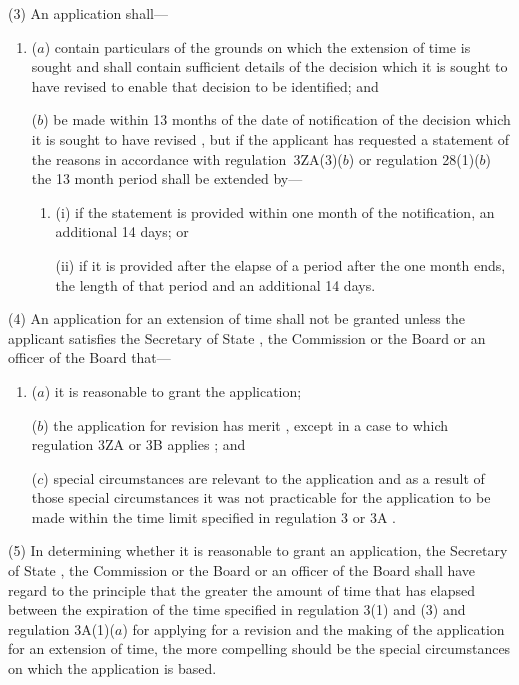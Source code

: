 \documentclass[12pt,a4paper]{article}
\begin{document}
(3) An application shall—
\begin{enumerate}\item[]
($a$) contain particulars of the grounds on which the extension of time is sought and shall contain sufficient details of the decision which it is sought to have revised to enable that decision to be identified; and

($b$) be made within 13 months of the date of notification of the decision which it is sought to have revised%
, but if the applicant has requested a statement of the reasons in accordance with 
regulation~3ZA(3)($b$)  or  %
regulation 28(1)($b$)  the 13 month period shall be extended by—
\begin{enumerate}\item[]
(i) if the statement is provided within one month of the notification, an additional 14 days; or

(ii) if it is provided after the elapse of a period after the one month ends, the length of that period and an additional 14 days.
\end{enumerate}  %
\end{enumerate}

(4) An application for an extension of time shall not be granted unless the applicant satisfies the Secretary of State%
, the Commission
or the Board or an officer of the Board  %
that—
\begin{enumerate}\item[]
($a$) it is reasonable to grant the application;

($b$) the application for revision has merit%
, except in a case to which regulation 3ZA or 3B applies%
; and

($c$) special circumstances are relevant to the application and as a result of those special circumstances it was not practicable for the application to be made within the time limit specified in regulation 3 
or 3A%
.
\end{enumerate}

(5) In determining whether it is reasonable to grant an application, the Secretary of State%
, the Commission
or the Board or an officer of the Board  %
shall have regard to the principle that the greater the amount of time that has elapsed between the expiration of the time specified in regulation 3(1) and (3) 
and regulation 3A(1)($a$)  %
for applying for a revision and the making of the application for an extension of time, the more compelling should be the special circumstances on which the application is based.
\end{document}
